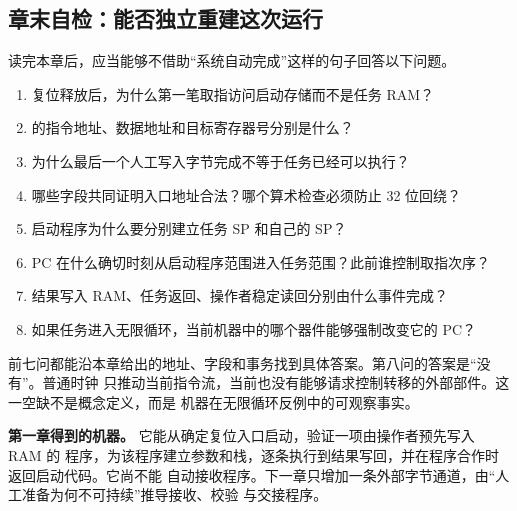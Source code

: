 \subsection{章末自检：能否独立重建这次运行}

读完本章后，应当能够不借助“系统自动完成”这样的句子回答以下问题。

\begin{enumerate}
\item 复位释放后，为什么第一笔取指访问启动存储而不是任务 RAM？
\item {} 的指令地址、数据地址和目标寄存器号分别是什么？
\item 为什么最后一个人工写入字节完成不等于任务已经可以执行？
\item 哪些字段共同证明入口地址合法？哪个算术检查必须防止 32 位回绕？
\item 启动程序为什么要分别建立任务 SP 和自己的 SP？
\item PC 在什么确切时刻从启动程序范围进入任务范围？此前谁控制取指次序？
\item 结果写入 RAM、任务返回、操作者稳定读回分别由什么事件完成？
\item 如果任务进入无限循环，当前机器中的哪个器件能够强制改变它的 PC？
\end{enumerate}

前七问都能沿本章给出的地址、字段和事务找到具体答案。第八问的答案是“没有”。普通时钟
只推动当前指令流，当前也没有能够请求控制转移的外部部件。这一空缺不是概念定义，而是
机器在无限循环反例中的可观察事实。

\begin{problemframe}
\textbf{第一章得到的机器。} 它能从确定复位入口启动，验证一项由操作者预先写入 RAM 的
程序，为该程序建立参数和栈，逐条执行到结果写回，并在程序合作时返回启动代码。它尚不能
自动接收程序。下一章只增加一条外部字节通道，由“人工准备为何不可持续”推导接收、校验
与交接程序。
\end{problemframe}
